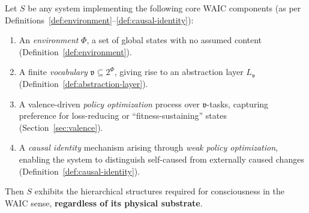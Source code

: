 \documentclass[12pt,letterpaper]{article}
\begin{document}
\begin{theorem}
\label{thm:substrate-independence}
Let $S$ be any system implementing the following core WAIC components (as per Definitions~\ref{def:environment}--\ref{def:causal-identity}):
\begin{enumerate}[label=\textnormal{(\arabic*)}]
    \item An \emph{environment} $\Phi$, a set of global states with no assumed content (Definition~\ref{def:environment}).
    \item A finite \emph{vocabulary} $\mathfrak{v} \subseteq 2^\Phi$, giving rise to an abstraction layer $L_{\mathfrak{v}}$ (Definition~\ref{def:abstraction-layer}).
    \item A valence-driven \emph{policy optimization} process over $\mathfrak{v}$-tasks, capturing preference for loss-reducing or ``fitness-sustaining'' states (Section~\ref{sec:valence}).
    \item A \emph{causal identity} mechanism arising through \emph{weak policy optimization}, enabling the system to distinguish self-caused from externally caused changes (Definition~\ref{def:causal-identity}).
\end{enumerate}
Then $S$ exhibits the hierarchical structures required for consciousness in the WAIC sense, \textbf{regardless of its physical substrate}.
\end{theorem}
\end{document}
